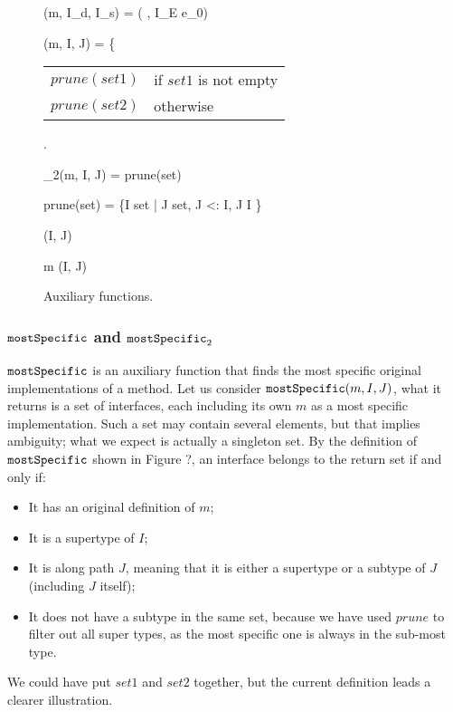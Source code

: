 \begin{figure*}[htbp]
	\begin{mathpar}
		{\mbody(m, I_d, I_s) = ( \; , I_E \; e_0)}
	
	{\mostSpecific(m, I, J) = \left\{{\begin{tabular}{ll}
				$prune(set1)$ & if $set1$ is not empty \\ $prune(set2)$ & otherwise
			\end{tabular}}\right.}
	
		{\mostSpecific_2(m, I, J) = prune(set)}
	
	prune(set) = \{I \in set \; | \; \nexists J \in set, J <: I, J \neq I \}
	
	{\ext(I, J)}
	
	{m \in \updateSet(I, J)}
	\end{mathpar}
	\caption{Auxiliary functions.}\label{fig:auxfunc}
\end{figure*}

\subsubsection{$\texttt{mostSpecific}$ and $\texttt{mostSpecific}_2$}

$\texttt{mostSpecific}$ is an auxiliary function that finds the most specific original implementations of a method. Let us consider $\texttt{mostSpecific}(m, I, J)$, what it returns is a set of interfaces, each including its own $m$ as a most specific implementation. Such a set may contain several elements, but that implies ambiguity; what we expect is actually a singleton set. By the definition of $\texttt{mostSpecific}$ shown in Figure ?, an interface belongs to the return set if and only if:
\begin{itemize}
	\item It has an original definition of $m$;
	\item It is a supertype of $I$;
	\item It is along path $J$, meaning that it is either a supertype or a subtype of $J$ (including $J$ itself);
	\item It does not have a subtype in the same set, because we have used $prune$ to filter out all super types, as the most specific one is always in the sub-most type.
\end{itemize}
We could have put $set1$ and $set2$ together, but the current definition leads a clearer illustration.

